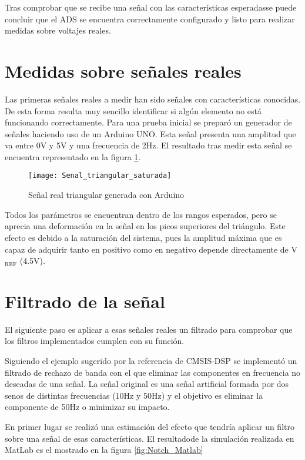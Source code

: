 Tras comprobar que se recibe una señal con las características esperadasse puede concluir que el ADS se encuentra correctamente configurado y listo para realizar medidas sobre voltajes reales.

\section{Medidas sobre señales reales\label{Resultados_Medida_Real}}

Las primeras señales reales a medir han sido señales con características conocidas. De esta forma resulta muy sencillo identificar si algún elemento no está funcionando correctamente. Para una prueba inicial se preparó un generador de señales haciendo uso de un Arduino UNO. Esta señal presenta una amplitud que va entre 0V y 5V y una frecuencia de 2Hz. El resultado tras medir esta señal se encuentra representado en la figura \ref{fig:Senal_triangular_saturada}.

\begin{figure} [H]
    \centering
    \texttt{[image: Senal\_triangular\_saturada]}
    \caption{Señal real triangular generada con Arduino}
    \label{fig:Senal_triangular_saturada}
\end{figure}

Todos los parámetros se encuentran dentro de los rangos esperados, pero se aprecia una deformación en la señal en los picos superiores del triángulo. Este efecto es debido a la saturación del sistema, pues la amplitud máxima que es capaz de adquirir tanto en positivo como en negativo depende directamente de V$_{\text{REF}}$ (4.5V).

\clearpage

\section{Filtrado de la señal\label{Resultados_filtrado}}

El siguiente paso es aplicar a esas señales reales un filtrado para comprobar que los filtros implementados cumplen con su función.

Siguiendo el ejemplo sugerido por la referencia de CMSIS-DSP se implementó un filtrado de rechazo de banda con el que eliminar las componentes en frecuencia no deseadas de una señal. La señal original es una señal artificial formada por dos senos de distintas frecuencias (10Hz y 50Hz) y el objetivo es eliminar la componente de 50Hz o minimizar su impacto. 

En primer lugar se realizó una estimación del efecto que tendría aplicar un filtro sobre una señal de esas características. El resultadode la simulación realizada en MatLab es el mostrado en la figura \ref{fig:Notch_Matlab}

